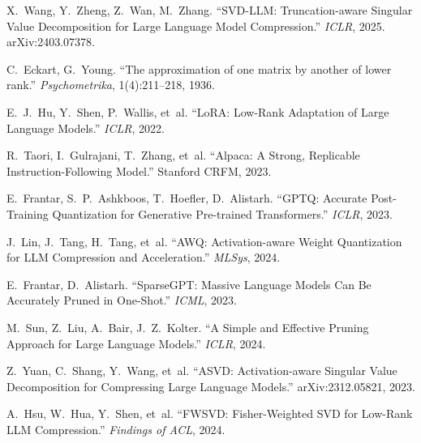 \documentclass[11pt,a4paper]{article}
\theoremstyle{remark}
\begin{document}
\begin{enumerate}[label={[\arabic*]}, leftmargin=2em]
  \item X.~Wang, Y.~Zheng, Z.~Wan, M.~Zhang.
    ``SVD-LLM: Truncation-aware Singular Value Decomposition for Large
    Language Model Compression.''
    \textit{ICLR}, 2025.
    arXiv:2403.07378.

  \item C.~Eckart, G.~Young.
    ``The approximation of one matrix by another of lower rank.''
    \textit{Psychometrika}, 1(4):211--218, 1936.

  \item E.~J.~Hu, Y.~Shen, P.~Wallis, et~al.
    ``LoRA: Low-Rank Adaptation of Large Language Models.''
    \textit{ICLR}, 2022.

  \item R.~Taori, I.~Gulrajani, T.~Zhang, et~al.
    ``Alpaca: A Strong, Replicable Instruction-Following Model.''
    Stanford CRFM, 2023.

  \item E.~Frantar, S.~P.~Ashkboos, T.~Hoefler, D.~Alistarh.
    ``GPTQ: Accurate Post-Training Quantization for Generative
    Pre-trained Transformers.''
    \textit{ICLR}, 2023.

  \item J.~Lin, J.~Tang, H.~Tang, et~al.
    ``AWQ: Activation-aware Weight Quantization for LLM Compression
    and Acceleration.''
    \textit{MLSys}, 2024.

  \item E.~Frantar, D.~Alistarh.
    ``SparseGPT: Massive Language Models Can Be Accurately Pruned in
    One-Shot.''
    \textit{ICML}, 2023.

  \item M.~Sun, Z.~Liu, A.~Bair, J.~Z.~Kolter.
    ``A Simple and Effective Pruning Approach for Large Language Models.''
    \textit{ICLR}, 2024.

  \item Z.~Yuan, C.~Shang, Y.~Wang, et~al.
    ``ASVD: Activation-aware Singular Value Decomposition for Compressing
    Large Language Models.''
    arXiv:2312.05821, 2023.

  \item A.~Hsu, W.~Hua, Y.~Shen, et~al.
    ``FWSVD: Fisher-Weighted SVD for Low-Rank LLM Compression.''
    \textit{Findings of ACL}, 2024.
\end{enumerate}
\end{document}

